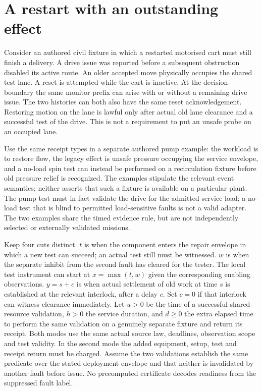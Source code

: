 \documentclass[11pt]{article}
\begin{document}
\section{A restart with an outstanding effect}
Consider an authored civil fixture in which a restarted motorised
cart must still finish a delivery. A drive issue was reported
before a subsequent obstruction disabled its active route.
An older accepted move physically occupies the shared test
lane. A reset is attempted while the cart is inactive. At the
decision boundary the same monitor prefix can arise with or
without a remaining drive issue. The two histories can both
also have the same reset acknowledgement. Restoring motion on
the lane is lawful only after actual old lane clearance and
a successful test of the drive. This is not a requirement to
put an unsafe probe on an occupied lane.

Use the same receipt types in a separate authored pump example:
the workload is to restore flow, the legacy effect is unsafe
pressure occupying the service envelope, and a no-load spin test
can instead be performed on a recirculation fixture before old
pressure relief is recognized. The examples stipulate the
relevant event semantics; neither asserts that such a fixture
is available on a particular plant. The pump test must in fact
validate the drive for the admitted service load; a no-load
test that is blind to permitted load-sensitive faults is not a
valid adapter. The two examples share the timed evidence rule,
but are not independently selected or externally validated
missions.

Keep four cuts distinct. \(t\) is when the component enters
the repair envelope in which a new test can succeed; an actual
test still must be witnessed. \(w\) is when the separate
inhibit from the second fault has cleared for the tester.
The local test instrument can start at \(x=\max(t,w)\) given
the corresponding enabling observations. \(y=s+c\) is when
actual settlement of old work at time \(s\) is established at
the relevant interlock, after a delay \(c\). Set \(c=0\) if
that interlock can witness clearance immediately. Let \(u>0\)
be the time of a successful shared-resource validation, \(h>0\)
the service duration, and \(d\ge0\) the extra elapsed time to
perform the same validation on a genuinely separate fixture
and return its receipt. Both modes use the same actual source
law, deadlines, observation scope and test validity. In the
second mode the added equipment, setup, test and receipt return
must be charged. Assume the two validations establish the same
predicate over the stated deployment envelope and that neither
is invalidated by another fault before issue. No precomputed
certificate decodes readiness from the suppressed fault label.
\end{document}
